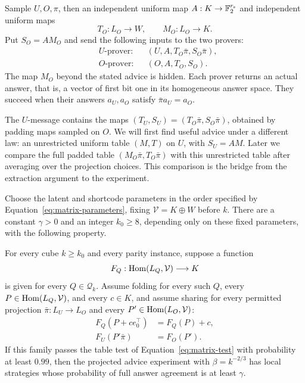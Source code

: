 \begin{definition}
\label{def:projected-advice}
Sample $U,O,\pi$, then an independent uniform map
$A:K\to\mathbb F_2^{r_{\rm s}}$ and independent uniform maps
\[
 T_O:L_O\to W,\qquad M_O:L_O\to K.
\]
Put $S_O=AM_O$ and send the following inputs to the two provers:
\begin{equation}
 \begin{aligned}
  &\text{$U$-prover:}&& (U,A,T_O\bar\pi,S_O\bar\pi),\\
  &\text{$O$-prover:}&& (O,A,T_O,S_O).
 \end{aligned}
 \label{eq:projected-advice}
\end{equation}
The map $M_O$ beyond the stated advice is hidden.  Each prover returns an
actual answer, that is, a vector of first bit one in its homogeneous
answer space.  They succeed when their answers $a_U,a_O$ satisfy
$\bar\pi a_U=a_O$.
\end{definition}

The $U$-message contains the maps
$(T_U,S_U)=(T_O\bar\pi,S_O\bar\pi)$, obtained by padding maps sampled
on $O$.  We will first find useful advice under a different law: an
unrestricted uniform table $(M,T)$ on $U$, with $S_U=AM$.  Later we
compare the full padded table $(M_O\bar\pi,T_O\bar\pi)$ with this
unrestricted table after averaging over the projection choices.  This
comparison is the bridge from the extraction argument to the experiment.

\begin{proposition}
\label{prop:matrix-decoding}
Choose the latent and shortcode parameters in the order specified by
Equation~\eqref{eq:matrix-parameters}, fixing $\mathcal V=K\oplus W$
before $k$.  There are a constant $\gamma>0$ and an integer $k_0\ge8$, depending only on
these fixed parameters, with the following property.

For every cube $k\ge k_0$ and every parity instance, suppose a function
\[
 F_Q:\operatorname{Hom}(L_Q,\mathcal V)\longrightarrow K
\]
is given for every $Q\in\mathcal Q_k$.  Assume folding for every such
$Q$, every $P\in\operatorname{Hom}(L_Q,\mathcal V)$, and every $c\in K$, and assume
sharing for every permitted projection $\bar\pi:L_U\to L_O$ and every
$P'\in\operatorname{Hom}(L_O,\mathcal V)$:
\begin{equation}
 \begin{aligned}
 F_Q(P+c e_0^\top)&=F_Q(P)+c,\\
 F_U(P'\bar\pi)&=F_O(P').
 \end{aligned}
 \label{eq:matrix-family-identities}
\end{equation}
If this family passes the table test of Equation~\eqref{eq:matrix-test}
with probability at least $0.99$, then the projected advice experiment
with $\beta=k^{-2/3}$ has local strategies whose probability of full
answer agreement is at least $\gamma$.
\end{proposition}

